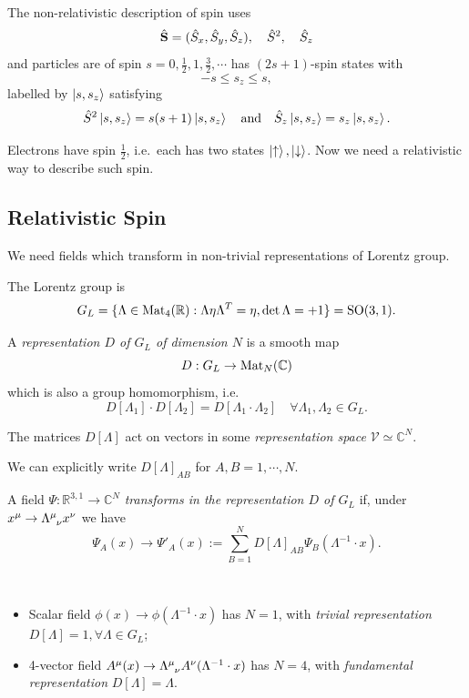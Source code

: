 \documentclass[a4paper,11pt]{article}
\begin{document}
	The non-relativistic description of spin uses 
	\[
		\hat{\vb S} = (\hat S_x, \hat S_y, \hat S_z), \quad \hat S^2, \quad \hat S_z
	\]
	and particles are of spin $s = 0, \frac{1}{2}, 1, \frac{3}{2}, \cdots$ has $(2s+1)$-spin states with
	\[
		-s \leq s_z \leq s,
	\]
	labelled by $\ket{s,s_z}$ satisfying
	\[
		\hat S^2 \ket{s,s_z} = s(s+1) \ket{s,s_z} \quad \text{and} \quad \hat S_z \ket{s,s_z} = s_z \ket{s,s_z}.
	\]
	
	Electrons have spin $\frac{1}{2}$, i.e.\ each has two states $\ket{\uparrow}, \ket{\downarrow}$. Now we need a relativistic way to describe such spin.

	\subsection{Relativistic Spin}
	We need fields which transform in non-trivial representations of Lorentz group. 

	The Lorentz group is
	\[
		G_L = \{\Lambda \in \operatorname{Mat}_4(\mathbb{R}) : \Lambda \eta \Lambda^T = \eta, \det \Lambda = +1\} = \operatorname{SO}(3,1).
	\]
	
	\begin{defi}
		A \emph{representation $D$ of $G_L$ of dimension $N$} is a smooth map 
	\[
		D : G_L \to \operatorname{Mat}_N(\mathbb{C})
	\]
	which is also a group homomorphism, i.e.\ 
	\[
		D[\Lambda_1] \cdot D[\Lambda_2] = D[\Lambda_1 \cdot \Lambda_2] \quad \forall \Lambda_1, \Lambda_2 \in G_L.
	\]

	The matrices $D[\Lambda]$ act on vectors in some \emph{representation space} $\mathcal{V} \simeq \mathbb{C}^N$.
	\end{defi}

	We can explicitly write $D[\Lambda]_{AB}$ for $A,B = 1, \cdots, N$.
	
	\begin{defi}
		A field $\Psi : \mathbb{R} ^{3,1} \to \mathbb{C}^N$ \emph{transforms in the representation $D$ of $G_L$} if, under $x^\mu \to \LT{\mu}{\nu} x^\nu$ we have
		\[
			\Psi_A(x) \to \Psi'_A(x) := \sum _{B = 1}^N D[\Lambda]_{AB} \Psi_B(\Lambda^{-1} \cdot x).
		\]
	\end{defi}

	\begin{ex}
		\ 
		\begin{itemize}
			\item Scalar field $\phi(x) \to \phi(\Lambda^{-1} \cdot x)$ has $N = 1$, with \emph{trivial representation} $D[\Lambda] = 1, \forall \Lambda \in G_L$;
			\item 4-vector field $A^\mu (x) \to \LT{\mu}{\nu} A ^\nu(\Lambda^{-1} \cdot x)$ has $N = 4$, with \emph{fundamental representation} $D[\Lambda] = \Lambda$. 
		\end{itemize}
	\end{ex}
\end{document}
